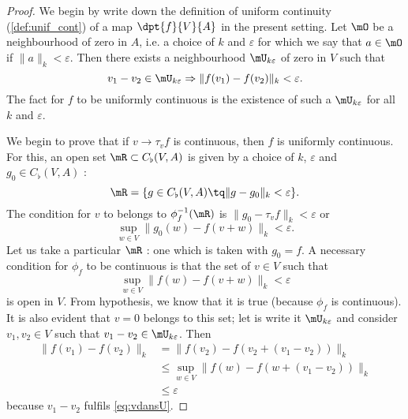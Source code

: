 \begin{proof}
We begin by write down the definition of uniform continuity (\ref{def:unif_cont}) of a map $\dpt{f}{V}{A}$ in the present setting. Let $\mO$ be a neighbourhood of zero in $A$, i.e. a choice of $k$ and $\varepsilon$ for which we say that $a\in\mO$ if $\| a \|_k<\varepsilon$. Then there exists a neighbourhood $\mU_{k\varepsilon}$ of zero in $V$ such that 
\begin{equation}
v_1-v_2\in\mU_{k\varepsilon}\Rightarrow \| f(v_1)-f(v_2) \|_k<\varepsilon.
\end{equation}
The fact for $f$ to be uniformly continuous is the existence of such a $\mU_{k\varepsilon}$ for all $k$ and $\varepsilon$. 

We begin to prove that if $v\to\tau_vf$ is continuous, then $f$ is uniformly continuous.  For this, an open set $\mR\subset C_{\flat}(V,A)$ is given by a choice of $k$, $\varepsilon$ and $g_0\in C_{\flat}(V,A)$ :
\begin{equation}
   \mR=\{ g\in C_{\flat}(V,A)\tq \| g-g_0 \|_k< \varepsilon  \}.
\end{equation}
The condition for $v$ to belongs to $\phi_f^{-1}(\mR)$ is $\| g_0-\tau_vf \|_k<\varepsilon$ or
\begin{equation}
  \sup_{w\in V}\| g_0(w)-f(v+w) \|_k<\varepsilon.
\end{equation}
Let us take a particular $\mR$ : one which is taken with $g_0=f$. A necessary condition for $\phi_f$ to be continuous is that the set of $v\in V$ such that
\begin{equation} \label{eq:vdansU}
  \sup_{w\in V}\| f(w)-f(v+w) \|_k<\varepsilon
\end{equation}
is open in $V$. From hypothesis, we know that it is true (because $\phi_f$ is continuous). It is also evident that $v=0$ belongs to this set; let is write it $\mU_{k\varepsilon}$ and consider $v_1,v_2\in V$ such that $v_1-v_2\in\mU_{k\varepsilon}$. Then
\begin{equation}
\begin{split}
  \| f(v_1)-f(v_2) \|_k&=\| f(v_2)-f(v_2+(v_1-v_2)) \|_k\\
                       &\leq \sup_{w\in V}\| f(w)-f(w+(v_1-v_2)) \|_k\\
                       &\leq \varepsilon
\end{split}
\end{equation}
because $v_1-v_2$ fulfils \eqref{eq:vdansU}.


\end{proof}
